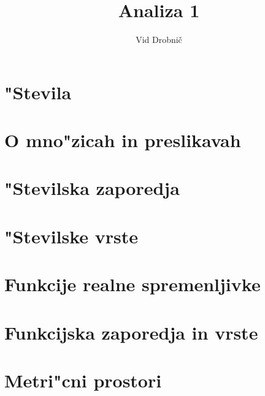 \documentclass[a4paper, 12pt]{article}
\title{Analiza 1}
\author{Vid Drobnič}
\date{}
\begin{document}
	\maketitle
	\thispagestyle{empty}
	\pagebreak
	\setcounter{page}{1}

	\tableofcontents
	\pagebreak

	\section{"Stevila}
	
	
	\section{O mno"zicah in preslikavah}
	
	
	\section{"Stevilska zaporedja}
	
	
	\section{"Stevilske vrste}
	
	
	\section{Funkcije realne spremenljivke}
	
    
    \section{Funkcijska zaporedja in vrste}
    
    
    \section{Metri"cni prostori}
    
\end{document}
